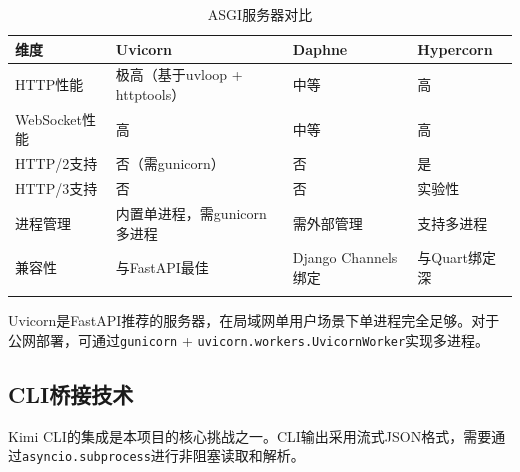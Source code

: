 \documentclass[fontset=mac,a4paper,11pt]{ctexart}
\begin{document}
\begin{table}[H]
\centering
\caption{ASGI服务器对比}
\label{tab:asgi-server}
\begin{tabular}{L{2.5cm}L{3.5cm}L{3.5cm}L{3.5cm}}
\toprule
\textbf{维度} & \textbf{Uvicorn} & \textbf{Daphne} & \textbf{Hypercorn} \\
\midrule
{}
HTTP性能 & 极高（基于uvloop + httptools） & 中等 & 高 \\
WebSocket性能 & 高 & 中等 & 高 \\
HTTP/2支持 & 否（需gunicorn） & 否 & 是 \\
HTTP/3支持 & 否 & 否 & 实验性 \\
进程管理 & 内置单进程，需gunicorn多进程 & 需外部管理 & 支持多进程 \\
兼容性 & 与FastAPI最佳 & Django Channels绑定 & 与Quart绑定深 \\
\bottomrule
\end{tabular}
\end{table}

Uvicorn是FastAPI推荐的服务器，在局域网单用户场景下单进程完全足够。对于公网部署，可通过\texttt{gunicorn} + \texttt{uvicorn.workers.UvicornWorker}实现多进程。

\subsection{CLI桥接技术}

Kimi CLI的集成是本项目的核心挑战之一。CLI输出采用流式JSON格式，需要通过\texttt{asyncio.subprocess}进行非阻塞读取和解析。
\end{document}
